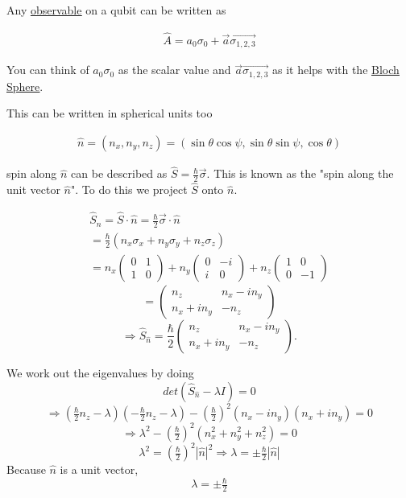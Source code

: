 \documentclass[
]{article}
\let\oldhyperref\hyperref
\renewcommand{\hyperref}[2][]{\oldhyperref[#1]{\underline{#2}}}
\providecommand{\Rarr}{\Rightarrow}
\begin{document}
Any \hyperref[observables]{observable} on a qubit can be written as

\begin{gather*}
	\hat{A}=a_0\sigma_0+\vec{a}\vec{\sigma_{1,2,3}}
\end{gather*}

You can think of \(a_0\sigma_0\) as the scalar value and
\(\vec{a}\vec{\sigma_{1,2,3}}\) as it helps with the \hyperref[bloch-sphere]{Bloch Sphere}.

This can be written in spherical units too

\begin{gather*}
	\hat{n}=(n_x,n_y,n_z)=(\sin\theta\cos\psi,\sin\theta\sin\psi,\cos\theta)
\end{gather*}

spin along \(\hat{n}\) can be described as  \(\hat{S}=\frac{\hbar}{2}\vec{\sigma}\).
This is known as the "spin along the unit vector \(\hat{n}\)".
To do this we project \(\hat{S}\) onto \(\hat{n}\).

\begin{gather*}
	\hat{S}_n=\hat{S}\cdot\hat{n}=\frac{\hbar}{2}\vec{\sigma}\cdot\hat{n}\\
	=\frac{\hbar}{2}\left(n_x\sigma_x+n_y\sigma_y+n_z\sigma_z\right)\\
	=n_x\!\begin{pmatrix}0&1\\1&0\end{pmatrix} + n_y\!\begin{pmatrix}0&-i\\i&0\end{pmatrix} + n_z\!\begin{pmatrix}1&0\\0&-1\end{pmatrix}
\end{gather*}
\[
	= \begin{pmatrix} n_z & n_x - i n_y \\ n_x + i n_y & -n_z \end{pmatrix}
\]
\[
	\Rarr \hat{S}_{\hat{n}} = \frac{\hbar}{2}\begin{pmatrix} n_z & n_x - i n_y \\ n_x + i n_y & -n_z \end{pmatrix}.
\]

We work out the eigenvalues by doing
\[
	det(\hat{S}_{\hat{n}} - \lambda I) = 0
\]
\[
	\Rarr \left(\tfrac{\hbar}{2}n_z-\lambda\right)\left(-\tfrac{\hbar}{2}n_z-\lambda\right) - \left(\tfrac{\hbar}{2}\right)^2(n_x - i n_y)(n_x + i n_y) = 0
\]
\[
	\Rarr \lambda^2 - \left(\tfrac{\hbar}{2}\right)^2(n_x^2+n_y^2+n_z^2) = 0
\]
\[
	\lambda^2=\left(\tfrac{\hbar}{2}\right)^2|\hat{n}|^2\Rarr\lambda=\pm\tfrac{\hbar}{2}|\hat{n}|
\]
Because \(\hat{n}\) is a unit vector,
\[
	\lambda=\pm\tfrac{\hbar}{2}
\]
\end{document}
